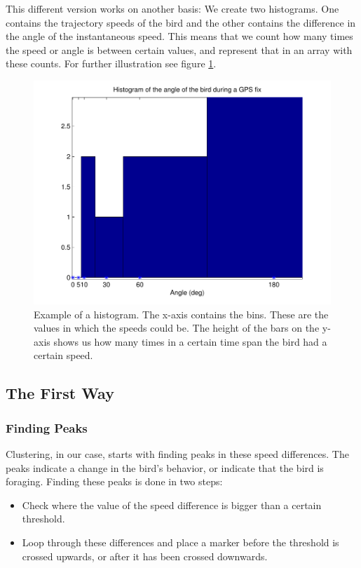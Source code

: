  This different version works on another basis: We create two histograms. One
 contains the trajectory speeds of the bird and the other contains the
 difference in the angle of the instantaneous speed. This means that we count
 how many times the speed or angle is between certain values, and represent that
 in an array with these counts. For further illustration see figure
 \ref{fig:histogram}.

\begin{figure}
\centering
\includegraphics[width=.8\textwidth]{histogram.pdf}
\caption{Example of a histogram. The x-axis contains the bins. These are the
values in which the speeds could be. The height of the bars on the y-axis shows
us how many times in a certain time span the bird had a certain speed.}
\label{fig:histogram}
\end{figure}

\subsection{The First Way}
 \subsubsection{Finding Peaks}
 Clustering, in our case, starts with finding peaks in these speed differences.
 The peaks indicate a change in the bird's behavior, or indicate that the bird
 is foraging. Finding these peaks is done in two steps:

 \begin{itemize}
    \item Check where the value of the speed difference is bigger than a certain
    threshold.
    \item Loop through these differences and place a marker before the threshold
    is crossed upwards, or after it has been crossed downwards. 
 \end{itemize}
 

